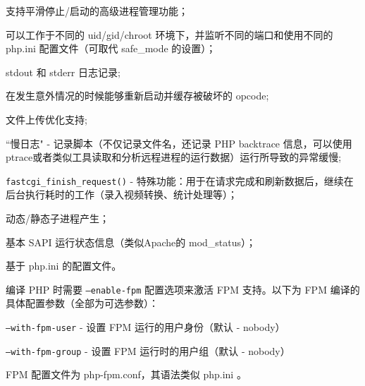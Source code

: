 \begin{compactitem}
\item 支持平滑停止/启动的高级进程管理功能；

\item 可以工作于不同的 uid/gid/chroot 环境下，并监听不同的端口和使用不同的 php.ini 配置文件（可取代 safe\_mode 的设置）；

\item stdout 和 stderr 日志记录;

\item 在发生意外情况的时候能够重新启动并缓存被破坏的 opcode;

\item 文件上传优化支持;

\item ``慢日志" - 记录脚本（不仅记录文件名，还记录 PHP backtrace 信息，可以使用 ptrace或者类似工具读取和分析远程进程的运行数据）运行所导致的异常缓慢;

\item \texttt{fastcgi\_finish\_request()} - 特殊功能：用于在请求完成和刷新数据后，继续在后台执行耗时的工作（录入视频转换、统计处理等）；

\item 动态/静态子进程产生；

\item 基本 SAPI 运行状态信息（类似Apache的 mod\_status）；

\item 基于 php.ini 的配置文件。

\end{compactitem}

编译 PHP 时需要 \texttt{--enable-fpm} 配置选项来激活 FPM 支持。以下为 FPM 编译的具体配置参数（全部为可选参数）：

\begin{compactitem}
\item \texttt{--with-fpm-user} - 设置 FPM 运行的用户身份（默认 - nobody）

\item \texttt{--with-fpm-group} - 设置 FPM 运行时的用户组（默认 - nobody）

\end{compactitem}

FPM 配置文件为 php-fpm.conf，其语法类似 php.ini 。


